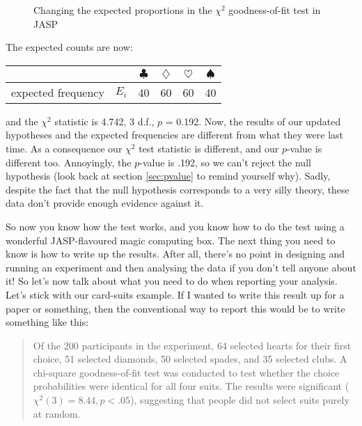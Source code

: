 \begin{figure}[htb]
\begin{center}
\caption{Changing the expected proportions in the \texorpdfstring{$\chi^2$}{} goodness-of-fit test in JASP}
\label{fig:chisquare.analysis2}
\HR
\end{center}
\end{figure}

\noindent
The expected counts are now: 
\begin{center}
\begin{tabular}{rc|cccc}
& & $\clubsuit$ & $\diamondsuit$ & $\heartsuit$ & $\spadesuit$ \\ \hline 
expected frequency &$E_i$ & 40 & 60 & 60 & 40 \\ 
\end{tabular}
\end{center}
and the $\chi^2$ statistic is 4.742, 3 d.f., $p$ = 0.192. Now, the results of our updated hypotheses and the expected frequencies are different from what they were last time. As a consequence our $\chi^2$ test statistic is different, and our $p$-value is different too. Annoyingly, the $p$-value is .192, so we can't reject the null hypothesis (look back at section \ref{sec:pvalue} to remind yourself why). Sadly, despite the fact that the null hypothesis corresponds to a very silly theory, these data don't provide enough evidence against it.


So now you know how the test works, and you know how to do the test using a wonderful JASP-flavoured magic computing box. The next thing you need to know is how to write up the results. After all, there's no point in designing and running an experiment and then analysing the data if you don't tell anyone about it! So let's now talk about what you need to do when reporting your analysis. Let's stick with our card-suits example. If I wanted to write this result up for a paper or something, then the conventional way to report this would be to write something like this:

\begin{quote}
Of the 200 participants in the experiment, 64 selected hearts for their first choice, 51 selected diamonds, 50 selected spades, and 35 selected clubs. A chi-square goodness-of-fit test was conducted to test whether the choice probabilities were identical for all four suits. The results were significant ($\chi^2(3) = 8.44, p<.05$), suggesting that people did not select suits purely at random.
\end{quote}

